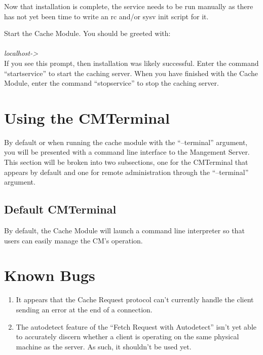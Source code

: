 \documentclass[letterpaper]{article}
\begin{document}
Now that installation is complete, the service needs to be run manually as there has not yet been time to write an rc and/or sysv init script for it.

Start the Cache Module. You should be greeted with:\\
\\
\textit{localhost-> }\\
If you see this prompt, then installation was likely successful. Enter the command ``startservice'' to start the caching server. When you have finished with the Cache Module, enter the command ``stopservice'' to stop the caching server.

\section{Using the CMTerminal}
By default or when running the cache module with the ``--terminal'' argument, you will be presented with a command line interface to the Mangement Server. This section will be broken into two subsections, one for the CMTerminal that appears by default and one for remote administration through the ``--terminal'' argument.

\subsection{Default CMTerminal}
By default, the Cache Module will launch a command line interpreter so that users can easily manage the CM's operation. 

\section{Known Bugs}
\begin{enumerate}
   \item It appears that the Cache Request protocol can't currently handle the client sending an error at the end of a connection.
   \item The autodetect feature of the ``Fetch Request with Autodetect'' isn't yet able to accurately discern whether a client is operating on the same physical machine as the server. As such, it shouldn't be used yet.
\end{enumerate}
\end{document}

